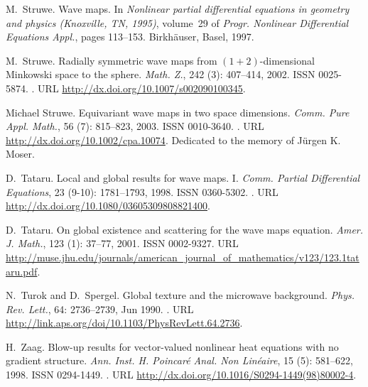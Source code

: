 \documentclass[11pt]{aims}
\theoremstyle{definition}
\numberwithin{equation}{section}
\begin{document}
\begin{thebibliography}{62}
M.~Struwe.
\newblock Wave maps.
\newblock In \emph{Nonlinear partial differential equations in geometry and
  physics ({K}noxville, {TN}, 1995)}, volume~29 of \emph{Progr. Nonlinear
  Differential Equations Appl.}, pages 113--153. Birkh\"auser, Basel, 1997.

M.~Struwe.
\newblock Radially symmetric wave maps from {$(1+2)$}-dimensional {M}inkowski
  space to the sphere.
\newblock \emph{Math. Z.}, 242 (3): 407--414, 2002.
\newblock ISSN 0025-5874.
\newblock {}.
\newblock URL \url{http://dx.doi.org/10.1007/s002090100345}.

Michael Struwe.
\newblock Equivariant wave maps in two space dimensions.
\newblock \emph{Comm. Pure Appl. Math.}, 56 (7): 815--823,
  2003.
\newblock ISSN 0010-3640.
\newblock {}.
\newblock URL \url{http://dx.doi.org/10.1002/cpa.10074}.
\newblock Dedicated to the memory of J\"urgen K. Moser.

D.~Tataru.
\newblock Local and global results for wave maps. {I}.
\newblock \emph{Comm. Partial Differential Equations}, 23
  (9-10): 1781--1793, 1998.
\newblock ISSN 0360-5302.
\newblock {}.
\newblock URL \url{http://dx.doi.org/10.1080/03605309808821400}.

D.~Tataru.
\newblock On global existence and scattering for the wave maps equation.
\newblock \emph{Amer. J. Math.}, 123 (1): 37--77, 2001.
\newblock ISSN 0002-9327.
\newblock URL
  \url{http://muse.jhu.edu/journals/american_journal_of_mathematics/v123/123.1tataru.pdf}.

N.~Turok and D.~Spergel.
\newblock Global texture and the microwave background.
\newblock \emph{Phys. Rev. Lett.}, 64: 2736--2739, Jun 1990.
\newblock {}.
\newblock URL \url{http://link.aps.org/doi/10.1103/PhysRevLett.64.2736}.

H.~Zaag.
\newblock Blow-up results for vector-valued nonlinear heat equations with no
  gradient structure.
\newblock \emph{Ann. Inst. H. Poincar{\'e} Anal. Non Lin{\'e}aire}, 15
  (5): 581--622, 1998.
\newblock ISSN 0294-1449.
\newblock {}.
\newblock URL \url{http://dx.doi.org/10.1016/S0294-1449(98)80002-4}.

\end{thebibliography}
\end{document}

